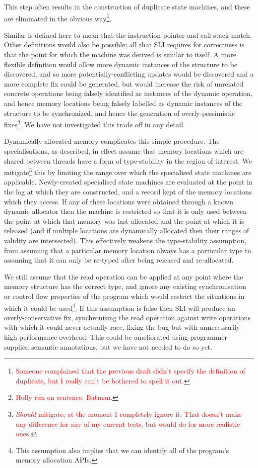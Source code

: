 \documentclass[10pt,twocolumn,preprint,natbib,authoryear]{sigplanconf}
\newcommand{\editorial}[1]{\textcolor{red}{\footnote{\textcolor{red}{#1}}}}
\begin{document}
This step often results in the construction of duplicate state
machines, and these are eliminated in the obvious
way\editorial{Someone complained that the previous draft didn't
  specify the definition of duplicate, but I really can't be bothered
  to spell it out.}.

Similar is defined here to mean that the instruction pointer and call
stack match.  Other definitions would also be possible; all that SLI
requires for correctness is that the point for which the machine was
derived is similar to itself.  A more flexible definition would allow
more dynamic instances of the structure to be discovered, and so more
potentially-conflicting updates would be discovered and a more
complete fix could be generated, but would increase the risk of
unrelated concrete operations being falsely identified as instances of
the dynamic operation, and hence memory locations being falsely
labelled as dynamic instances of the structure to be synchronized, and
hence the generation of overly-pessimistic fixes\editorial{Holly run
  on sentence, Batman.}.  We have not investigated this trade off in
any detail.

Dynamically allocated memory complicates this simple procedure.  The
specialisations, as described, in effect assume that memory locations
which are shared between threads have a form of type-stability in the
region of interest.  We mitigate\editorial{\emph{Should} mitigate; at
  the moment I completely ignore it.  That doesn't make any difference
  for any of my current tests, but would do for more realistic ones.}
this by limiting the range over which the specialised state machines
are applicable.  Newly-created specialised state machines are
evaluated at the point in the log at which they are constructed, and a
record kept of the memory locations which they access.  If any of
these locations were obtained through a known dynamic allocator then
the machine is restricted so that it is only used between the point at
which that memory was last allocated and the point at which it is
released (and if multiple locations are dynamically allocated then
their ranges of validity are intersected).  This effectively weakens
the type-stability assumption, from assuming that a particular memory
location always has a particular type to assuming that it can only be
re-typed after being released and re-allocated.

We still assume that the read operation can be applied at any point
where the memory structure has the correct type, and ignore any
existing synchronisation or control flow properties of the program
which would restrict the situations in which it could be
used\footnote{This assumption also implies that we can identify all of
  the program's memory allocation APIs.}.  If this assumption is false
then SLI will produce an overly-conservative fix, synchronising the
read operation against write operations with which it could never
actually race, fixing the bug but with unnecessarily high performance
overhead.  This could be ameliorated using programmer-supplied
semantic annotations, but we have not needed to do so yet.
\end{document}

